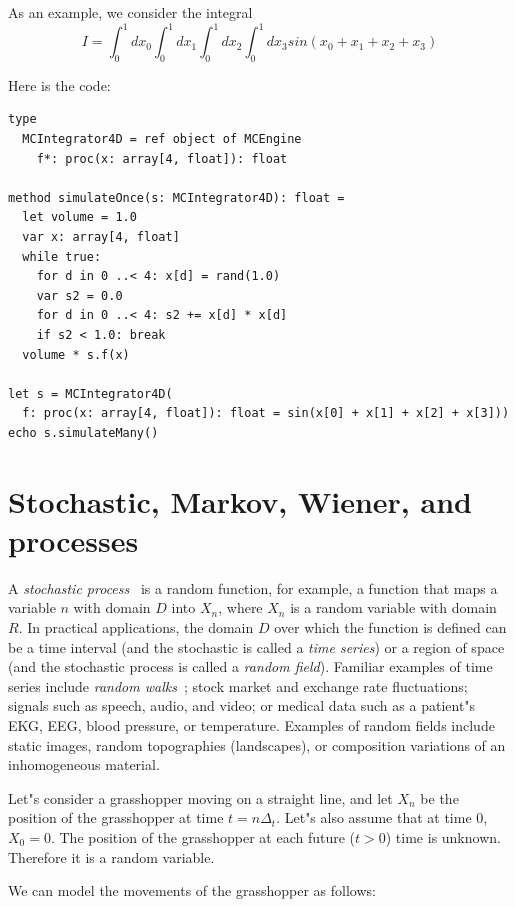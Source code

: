 \documentclass[justified, sixbynine]{tufte-book}
\theoremstyle{plain}%
\newtheorem * {corollary}{Corollary}
\theoremstyle{definition}
\theoremstyle{remark}
\newtheorem * {remark}{Remark}
\newtheorem * {note}{Note}
\begin{document}
\begin{fullwidth}
As an example, we consider the integral
\begin{equation}
I = \int_0^1 dx_0 \int_0^1 dx_1 \int_0^1 dx_2 \int_0^1 dx_3 sin(x_0+x_1+x_2+x_3)
\end{equation}

Here is the code:
\begin{lstlisting}
type
  MCIntegrator4D = ref object of MCEngine
    f*: proc(x: array[4, float]): float

method simulateOnce(s: MCIntegrator4D): float =
  let volume = 1.0
  var x: array[4, float]
  while true:
    for d in 0 ..< 4: x[d] = rand(1.0)
    var s2 = 0.0
    for d in 0 ..< 4: s2 += x[d] * x[d]
    if s2 < 1.0: break
  volume * s.f(x)

let s = MCIntegrator4D(
  f: proc(x: array[4, float]): float = sin(x[0] + x[1] + x[2] + x[3]))
echo s.simulateMany()
\end{lstlisting}

\goodbreak\section{Stochastic, Markov, Wiener, and processes}


A {\it stochastic process}~\cite{stochastic} is a random function, 
for example, a function that maps a
variable $n$ with domain $D$ into $X_n$, where $X_n$ is a random variable
with domain $R$. In practical applications, the domain $D$ over which the
function is defined can be a time interval (and the stochastic is called a
{\it time series}) or a region of space (and the stochastic process is
called a {\it random field}). Familiar examples of time series include {\it %
random walks}~\cite{rwalk}; stock market and exchange rate fluctuations; signals such as
speech, audio, and video; or medical data such as a patient"s EKG, EEG, blood
pressure, or temperature. Examples of random fields include static images, 
random topographies (landscapes), or composition variations of an
inhomogeneous material.

Let"s consider a grasshopper moving on a straight line, and let $X_n$ be the
position of the grasshopper at time $t=n\Delta _t$. Let"s also assume that at time 0, 
$X_0=0$. The position of the grasshopper at each future ($t>0$) time is unknown.
Therefore it is a random variable.

We can model the movements of the grasshopper as follows:


\end{fullwidth}
\end{document}
